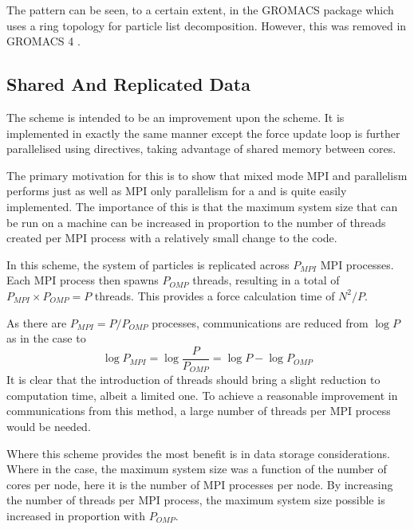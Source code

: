 The \systolicloop{} pattern can be seen, to a certain extent, in the
GROMACS \cite{berendsen1995gromacs} package which uses a ring
topology for particle list decomposition.
%
However, this was removed in GROMACS 4 \cite{hess2008gromacs}.



\subsection{Shared And Replicated Data}

The \sharedandreplicateddata{} scheme is intended to be an improvement
upon the \replicateddata{} scheme.
It is implemented in exactly the same
manner except the force update loop is further
parallelised using \openmp{} directives, taking advantage of shared
memory between cores.

The primary motivation for this is to show that mixed mode MPI and \openmp{}
parallelism performs just as well as MPI only parallelism for a
\replicateddata{} and is quite easily implemented.
%
The importance of this is that the maximum system size that can
be run on a machine
can be increased in proportion to the number of \openmp{} threads
created per MPI process with a relatively small change to the code.

In this scheme, the system of particles is replicated across
$P_{MPI}$ MPI processes.
%
Each MPI process then spawns $P_{OMP}$ threads, resulting in a total
of $P_{MPI}\times{}P_{OMP} = P$ threads.
%
This provides a force calculation time of $N^2/P$.

As there are $P_{MPI} = P/P_{OMP}$ processes, communications are
reduced from $\log{P}$ as in the \replicateddata{} case to
\begin{equation}
    \log{P_{MPI}} = \log{\frac{P}{P_{OMP}}} = \log{P} - \log{P_{OMP}}
\end{equation}
%
It is clear that the introduction of \openmp{} threads should
bring a slight reduction to computation time, albeit a limited one.
%
To achieve a reasonable improvement in communications from this method,
a large number of \openmp{} threads per MPI process would be needed.

Where this scheme provides the most benefit is in data storage considerations.
%
Where in the \replicateddata{} case, the maximum system size was a function
of the number of cores per node, here it is the number of MPI processes
per node.
%
By increasing the number of \openmp{} threads per MPI process,
the maximum system size possible is increased
in proportion with $P_{OMP}$.


